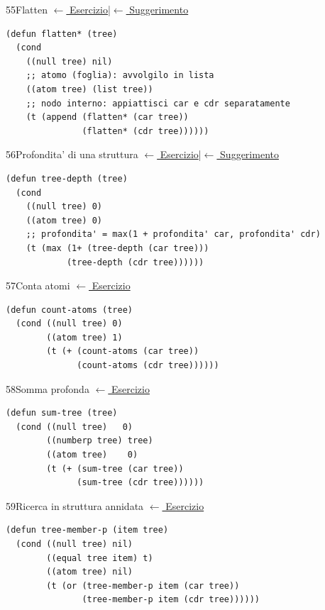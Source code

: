 \label{sol:55}
\begin{solbox}{55}{Flatten}
\small\color{black!55}\hyperref[ex:55]{$\leftarrow$ Esercizio}\enspace\textcolor{black!30}{|}\enspace\hyperref[hint:55]{$\leftarrow$ Suggerimento}\normalsize\color{black}
\begin{lstlisting}
(defun flatten* (tree)
  (cond
    ((null tree) nil)
    ;; atomo (foglia): avvolgilo in lista
    ((atom tree) (list tree))
    ;; nodo interno: appiattisci car e cdr separatamente
    (t (append (flatten* (car tree))
               (flatten* (cdr tree))))))
\end{lstlisting}
\end{solbox}

\label{sol:56}
\begin{solbox}{56}{Profondita' di una struttura}
\small\color{black!55}\hyperref[ex:56]{$\leftarrow$ Esercizio}\enspace\textcolor{black!30}{|}\enspace\hyperref[hint:56]{$\leftarrow$ Suggerimento}\normalsize\color{black}
\begin{lstlisting}
(defun tree-depth (tree)
  (cond
    ((null tree) 0)
    ((atom tree) 0)
    ;; profondita' = max(1 + profondita' car, profondita' cdr)
    (t (max (1+ (tree-depth (car tree)))
            (tree-depth (cdr tree))))))
\end{lstlisting}
\end{solbox}

\label{sol:57}
\begin{solbox}{57}{Conta atomi}
\small\color{black!55}\hyperref[ex:57]{$\leftarrow$ Esercizio}\normalsize\color{black}
\begin{lstlisting}
(defun count-atoms (tree)
  (cond ((null tree) 0)
        ((atom tree) 1)
        (t (+ (count-atoms (car tree))
              (count-atoms (cdr tree))))))
\end{lstlisting}
\end{solbox}

\label{sol:58}
\begin{solbox}{58}{Somma profonda}
\small\color{black!55}\hyperref[ex:58]{$\leftarrow$ Esercizio}\normalsize\color{black}
\begin{lstlisting}
(defun sum-tree (tree)
  (cond ((null tree)   0)
        ((numberp tree) tree)
        ((atom tree)    0)
        (t (+ (sum-tree (car tree))
              (sum-tree (cdr tree))))))
\end{lstlisting}
\end{solbox}

\label{sol:59}
\begin{solbox}{59}{Ricerca in struttura annidata}
\small\color{black!55}\hyperref[ex:59]{$\leftarrow$ Esercizio}\normalsize\color{black}
\begin{lstlisting}
(defun tree-member-p (item tree)
  (cond ((null tree) nil)
        ((equal tree item) t)
        ((atom tree) nil)
        (t (or (tree-member-p item (car tree))
               (tree-member-p item (cdr tree))))))
\end{lstlisting}
\end{solbox}

